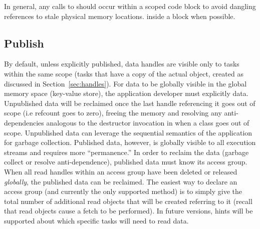 In general, any calls to  should occur 
within a scoped code block to avoid dangling references to stale physical memory locations.
inside a  block when possible.




\subsection{Publish}
\label{subsec:publish}
By default, unless explicitly published, data \glspl{handle} are visible only
to \glspl{task} within the same scope (\glspl{task} that have a copy of the actual
\ahandleT object, created as discussed in Section~\ref{sec:handles}).
For data to be globally visible in the global memory space (\gls{key-value store}),
the application developer must explicitly  data.  
Unpublished data will be reclaimed once the last \gls{handle} referencing it goes out of scope (i.e refcount goes to zero),
freeing the memory and resolving any anti-dependencies analogous to the
destructor invocation in \CC{} when a class goes out of scope.  
Unpublished data can leverage the \gls{sequential semantics} of the application
for \gls{garbage collection}.   
Published data, however, is globally visible to all \glspl{execution stream} and requires more ``permanence.''  
In order to reclaim the  data (garbage collect or resolve
anti-dependence), published data must know its \gls{access group}.
When all read \glspl{handle} within an \gls{access group} have been deleted or
released \emph{globally}, the published  data can be reclaimed.
The easiest way to declare an \gls{access group} (and currently the only supported method) is
to simply give the total number of additional read \ahandleT objects that will
be created referring to it (recall that read \ahandleT objects cause a
\gls{fetch} to be performed).
In future versions, hints will be supported about which specific \glspl{task} will need to read data.
